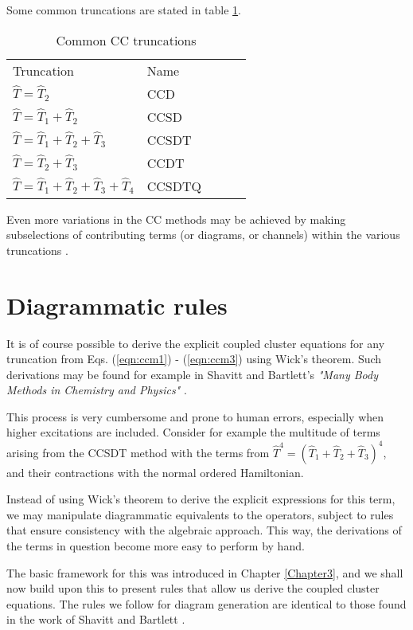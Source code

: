 Some common truncations are stated in table \ref{tab:cctrunc}.
\begin{table}[]
\centering
\caption{Common CC truncations}
\label{tab:cctrunc}
\begin{tabular}{lllll}
Truncation & Name & \\
$\hat{T} = \hat{T}_2$           & CCD   &  \\
$\hat{T} = \hat{T}_1 + \hat{T}_2$          & CCSD  &  \\
$\hat{T} = \hat{T}_1 + \hat{T}_2 +\hat{T}_3$           & CCSDT     &  \\
$\hat{T} = \hat{T}_2 + \hat{T}_3$           & CCDT     &   \\
$\hat{T} = \hat{T}_1 + \hat{T}_2 +  \hat{T}_3 + \hat{T}_4$           & CCSDTQ    &   \\
\end{tabular}
\end{table}

Even more variations in the CC methods may be achieved by making
subselections of contributing terms (or diagrams, or channels) within
the various truncations \cite{Shepherd2013}.


\section{Diagrammatic rules}

It is of course possible to derive the explicit coupled cluster
equations for any truncation from Eqs. (\ref{eqn:ccm1}) -
(\ref{eqn:ccm3}) using Wick's theorem. Such derivations may be found
for example in Shavitt and 
Bartlett's \emph{"Many Body Methods in  Chemistry and Physics"} \cite[Chapter 9]{ShavittBartlett2009}.

This process is very cumbersome and prone to human errors, especially
when higher excitations are included. Consider for example the
multitude of terms arising from the CCSDT method with the terms from
$\hat{T}^4 = (\hat{T}_1 + \hat{T}_2 + \hat{T}_3)^4$, and their
contractions with the normal ordered Hamiltonian.

Instead of using Wick's theorem to derive the explicit expressions for
this term, we may manipulate diagrammatic equivalents to the
operators, subject to rules that ensure consistency with the algebraic
approach. This way, the derivations of the terms in question become
more easy to perform by hand.

The basic framework for this was introduced in Chapter
\ref{Chapter3}, and we shall now build upon this to present rules
that allow us derive the coupled cluster equations. The rules we follow
for diagram generation are identical to those found in the work of
Shavitt and Bartlett \cite[p.297]{ShavittBartlett2009}.

